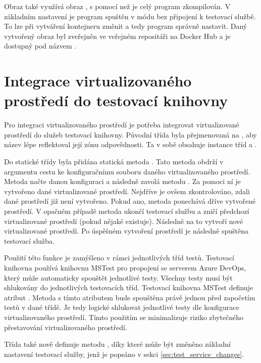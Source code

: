 Obraz také využívá obraz , s pomocí než je celý program zkompilován. V základním nastavení je program spuštěn v módu bez připojení k testovací službě. To lze při vytváření kontejneru změnit a tedy program správně nastavit. Daný vytvořený obraz byl zveřejněn ve veřejném repositáři na Docker Hub\cite{docker_hub} a je dostupný pod názvem .

\section{Integrace virtualizovaného prostředí do testovací knihovny}

Pro integraci virtualizovaného prostředí je potřeba integrovat virtualizované prostředí do služeb testovací knihovny. Původní třída  byla přejmenovaná na , aby název lépe reflektoval její zónu odpovědnosti. Ta v sobě obsahuje instance tříd  a .

Do statické třídy  byla přidána statická metoda . Tato metoda obdrží v argumentu cestu ke konfiguračnímu souboru daného virtualizovaného prostředí. Metoda načte danou konfiguraci a následně zavolá metodu . Za pomoci ní je vytvořeno dané virtualizované prostředí. Nejdříve je ovšem zkontrolováno, zdali dané prostředí již není vytvořeno. Pokud ano, metoda ponechává dříve vytvořené prostředí. V opačném případě metoda ukončí testovací službu a zničí předchozí virtualizované prostředí (pokud nějaké existuje). Následně na to vytvoří nové virtualizované prostředí. Po úspěšném vytvoření prostředí je následně spuštěna testovací služba.

Použití této funkce je zamýšleno v rámci jednotlivých tříd testů. Testovací knihovna používá knihovnu MSTest pro propojení se serverem Azure DevOps, který může automaticky spouštět jednotlivé testy. Všechny testy musí být shlukovány do jednotlivých testovacích tříd. Testovací knihovna MSTest definuje atribut . Metoda s tímto atributem bude spouštěna právě jednou před započetím testů v dané třídě. Je tedy logické shlukovat jednotlivé testy dle konfigurace virtualizovaného prostředí. Tímto použitím se minimalizuje riziko zbytečného přestavování virtualizovaného prostředí. 

Třída  také nově definuje metodu , díky které může být změněno základní nastavení testovací služby, jenž je popsáno v sekci \ref{sec:test_service_changes}.


